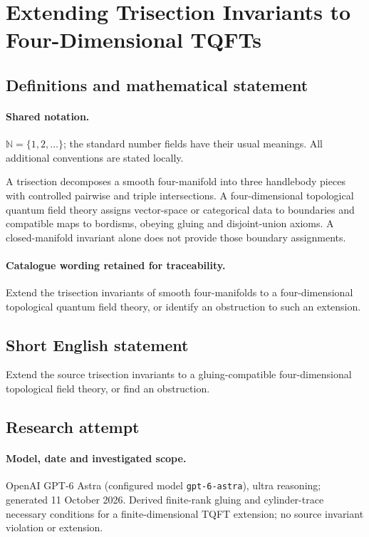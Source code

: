 \documentclass[11pt]{article}
\begin{document}
\section{Extending Trisection Invariants to Four-Dimensional TQFTs}\label{statement}

\subsection{Definitions and mathematical statement}

\paragraph{Shared notation.}$\mathbb N=\{1,2,\ldots\}$; the standard number fields have their usual meanings. All additional conventions are stated locally.


A trisection decomposes a smooth four-manifold into three handlebody pieces with controlled pairwise and triple intersections. A four-dimensional topological quantum field theory assigns vector-space or categorical data to boundaries and compatible maps to bordisms, obeying gluing and disjoint-union axioms. A closed-manifold invariant alone does not provide those boundary assignments.

\paragraph{Catalogue wording retained for traceability.}
Extend the trisection invariants of smooth four-manifolds to a four-dimensional topological quantum field theory, or identify an obstruction to such an extension.
\subsection{Short English statement}
Extend the source trisection invariants to a gluing-compatible four-dimensional topological field theory, or find an obstruction.
\subsection{Research attempt}
\paragraph{Model, date and investigated scope.}
OpenAI GPT-6 Astra (configured model \texttt{gpt-6-astra}), ultra reasoning; generated 11 October 2026. Derived finite-rank gluing and cylinder-trace necessary conditions for a finite-dimensional TQFT extension; no source invariant violation or extension.
\end{document}
